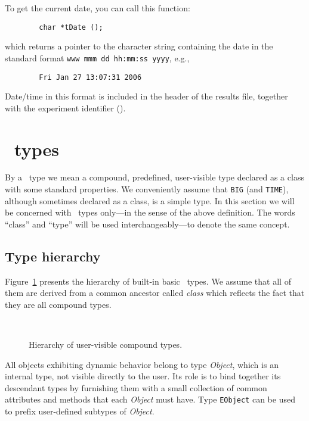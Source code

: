 To get the current date, you can call this function:
\begin{verbatim}
        char *tDate ();
\end{verbatim}
which returns a pointer to the character string containing the date in the
standard format {\tt www\ mmm\ dd\ hh:mm:ss\ yyyy}, e.g.,
\begin{verbatim}
        Fri Jan 27 13:07:31 2006
\end{verbatim}

Date/time in this format is included in the header of the results
file, together with the experiment identifier ().

\section{\smurph\ types}
\label{rm_st}

By a \smurph\ type we mean a compound, predefined, user-visible
type declared as a class with some standard properties.
We conveniently assume that {\tt BIG} (and {\tt TIME}), although sometimes
declared as a class, is a simple type.
In this section we will be concerned with \smurph\ types only---in the sense of
the above definition.
The words ``class'' and ``type'' will be used interchangeably---to
denote the same concept.

\subsection{Type hierarchy}
\label{rm_st_th}

Figure~\ref{ty_hi}
presents the hierarchy of built-in basic \smurph\ types.
We assume that all of them are derived from a common ancestor called
{\em class} which reflects the fact that they are all compound types.

\begin{figure}
\begin{center}
\ 
\caption{Hierarchy of user-visible compound types.}%
\label{ty_hi}
\end{center}
\end{figure}

All objects exhibiting dynamic behavior belong to type {\em Object}, which
is an internal type, not visible directly to the user.
Its role is to bind together its descendant types by furnishing them with a
small collection of common attributes and methods that each
{\em Object\/} must have.
Type {\tt EObject} can be used to prefix user-defined subtypes of {\em Object}.

